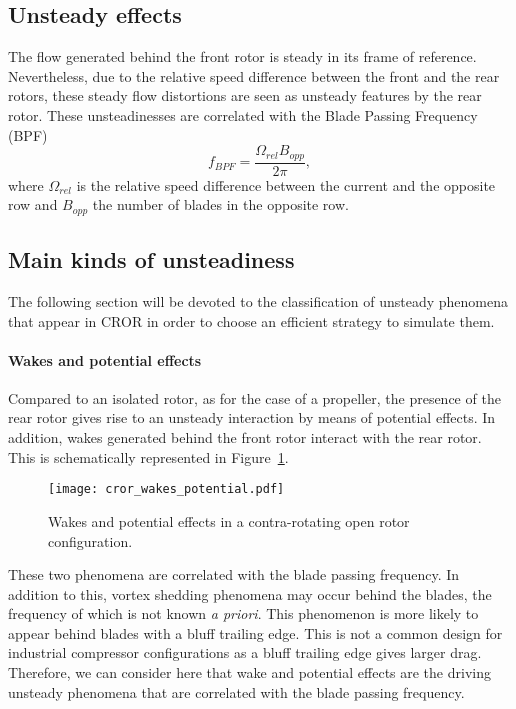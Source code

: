 
\subsection{Unsteady effects}
\label{sub:cror_from_steady_to_unsteady_phenomena}

The flow generated behind the front rotor
is steady in its frame of reference. Nevertheless,
due to the relative speed difference between the
front and the rear rotors, these steady flow distortions are
seen as unsteady features by the rear rotor. 
These unsteadinesses are correlated with the Blade Passing Frequency (BPF)
\begin{equation}
	f_{BPF} = \frac{\Omega_{rel} B_{opp}}{2 \pi},
\end{equation}
where $\Omega_{rel}$ is the relative speed difference between
the current and the opposite row
and $B_{opp}$ the number of blades in the opposite row.

\subsection{Main kinds of unsteadiness}
\label{sub:cror_main_unsteadinesses}

The following section will be devoted to the classification
of unsteady phenomena that appear in CROR in 
order to choose an efficient strategy to simulate them.

\paragraph{Wakes and potential effects}

Compared to an isolated rotor, as for the case of a propeller,
the presence of the rear rotor gives rise to an unsteady
interaction by means of potential effects. In addition, wakes generated
behind the front rotor interact with the rear rotor.
This is schematically represented in Figure~\ref{fig:cror_wakes_potential}.
\begin{figure}[htp]
  \centering
  \texttt{[image: cror\_wakes\_potential.pdf]}
  \caption{Wakes and potential effects in a 
  contra-rotating open rotor configuration.}
  \label{fig:cror_wakes_potential}
\end{figure}
These two phenomena are correlated with the blade passing frequency.
In addition to this, vortex shedding phenomena may occur behind the blades, 
the frequency of which is not known \emph{a priori}.
This phenomenon is more likely to appear behind blades with a bluff trailing edge.
This is not a common design for industrial compressor 
configurations as a bluff trailing edge
gives larger drag. Therefore, we can consider here that 
wake and potential effects are the driving unsteady phenomena
that are correlated with the blade passing frequency.

